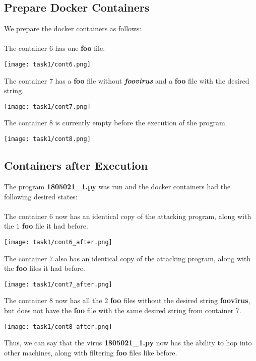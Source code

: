 \documentclass{article}
\begin{document}
\subsection{Prepare Docker Containers}
We prepare the docker containers as follows:\\\\
The container $6$ has one \textbf{foo} file.
\begin{center}
    \texttt{[image: task1/cont6.png]}
\end{center}
The container $7$ has a \textbf{foo} file without \textbf{\textit{foovirus}} and a \textbf{foo} file with the desired string.
\begin{center}
    \texttt{[image: task1/cont7.png]}
\end{center}
The container $8$ is currently empty before the execution of the program.
\begin{center}
    \texttt{[image: task1/cont8.png]}
\end{center}


\subsection{Containers after Execution}
The program \textbf{1805021\_1.py} was run and the docker containers had the following desired states:\\\\

The container $6$ now has an identical copy of the attacking program, along with the $1$ \textbf{foo} file it had before. 
\begin{center}
    \texttt{[image: task1/cont6\_after.png]}
\end{center}

The container $7$ also has an identical copy of the attacking program, along with the \textbf{foo} files it had before. 
\begin{center}
    \texttt{[image: task1/cont7\_after.png]}
\end{center}

The container $8$ now has all the $2$ \textbf{foo} files without the desired string \textbf{foovirus}, but does not have the \textbf{foo} file with the same desired string from container $7$.
\begin{center}
    \texttt{[image: task1/cont8\_after.png]}
\end{center}

Thus, we can say that the virus \textbf{1805021\_1.py} now has the ability to hop into other machines, along with filtering \textbf{foo} files like before.
\end{document}
